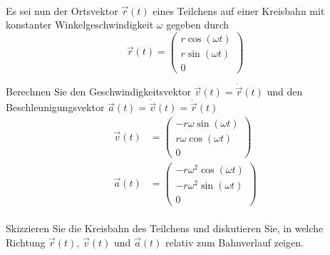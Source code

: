 \begin{enumeralph}
\begin{enumeroman}
\begin{align*}
			\end{align*}
		\end{enumeroman}
		\item Es sei nun der Ortsvektor $\overrightarrow{r}(t)$ eines Teilchens auf einer Kreisbahn mit konstanter Winkelgeschwindigkeit $\omega$ gegeben durch \[\overrightarrow{r}(t)=\begin{pmatrix}r\cos(\omega t)\\r\sin(\omega t)\\0\end{pmatrix}\]
		\begin{enumeroman}
			\item Berechnen Sie den Geschwindigkeitsvektor $\overrightarrow{v}(t)=\dot{\overrightarrow{r}}(t)$ und den Beschleunigungsvektor $\overrightarrow{a}(t)=\dot{\overrightarrow{v}}(t)=\ddot{\overrightarrow{r}}(t)$
			\begin{align*}
			\overrightarrow{v}(t)&=\begin{pmatrix}-r\omega\sin(\omega t)\\r\omega\cos(\omega t)\\0\end{pmatrix}\\
			\overrightarrow{a}(t)&=\begin{pmatrix}-r\omega^2\cos(\omega t)\\-r\omega^2\sin(\omega t)\\0\end{pmatrix}\\
			\end{align*}
			\item Skizzieren Sie die Kreisbahn des Teilchens und diskutieren Sie, in welche Richtung $\overrightarrow{r}(t)$, $\overrightarrow{v}(t)$ und $\overrightarrow{a}(t)$ relativ zum Bahnverlauf zeigen.\\
			\begin{tikzpicture}



\end{tikzpicture}
\end{enumeroman}
\end{enumeralph}

